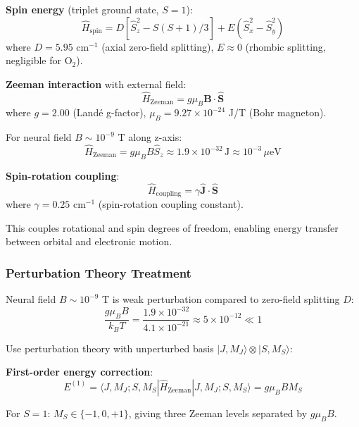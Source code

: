 \documentclass[11pt,onecolumn]{article}
\begin{document}
\textbf{Spin energy} (triplet ground state, $S=1$):
\begin{equation}
\hat{H}_{\text{spin}} = D[\hat{S}_z^2 - S(S+1)/3] + E(\hat{S}_x^2 - \hat{S}_y^2)
\end{equation}
where $D = 5.95$ cm$^{-1}$ (axial zero-field splitting), $E \approx 0$ (rhombic splitting, negligible for O$_2$).

\textbf{Zeeman interaction} with external field:
\begin{equation}
\hat{H}_{\text{Zeeman}} = g\mu_B \mathbf{B} \cdot \hat{\mathbf{S}}
\end{equation}
where $g = 2.00$ (Landé g-factor), $\mu_B = 9.27 \times 10^{-24}$ J/T (Bohr magneton).

For neural field $B \sim 10^{-9}$ T along z-axis:
\begin{equation}
\hat{H}_{\text{Zeeman}} = g\mu_B B \hat{S}_z \approx 1.9 \times 10^{-32}\,\text{J} \approx 10^{-3}\,\mu\text{eV}
\end{equation}

\textbf{Spin-rotation coupling}:
\begin{equation}
\hat{H}_{\text{coupling}} = \gamma \hat{\mathbf{J}} \cdot \hat{\mathbf{S}}
\end{equation}
where $\gamma = 0.25$ cm$^{-1}$ (spin-rotation coupling constant).

This couples rotational and spin degrees of freedom, enabling energy transfer between orbital and electronic motion.

\subsubsection{Perturbation Theory Treatment}

Neural field $B \sim 10^{-9}$ T is weak perturbation compared to zero-field splitting $D$:
\begin{equation}
\frac{g\mu_B B}{k_B T} = \frac{1.9 \times 10^{-32}}{4.1 \times 10^{-21}} \approx 5 \times 10^{-12} \ll 1
\end{equation}

Use perturbation theory with unperturbed basis $|J, M_J\rangle \otimes |S, M_S\rangle$:

\textbf{First-order energy correction}:
\begin{equation}
E^{(1)} = \langle J, M_J; S, M_S | \hat{H}_{\text{Zeeman}} | J, M_J; S, M_S \rangle = g\mu_B B M_S
\end{equation}

For $S=1$: $M_S \in \{-1, 0, +1\}$, giving three Zeeman levels separated by $g\mu_B B$.
\end{document}
